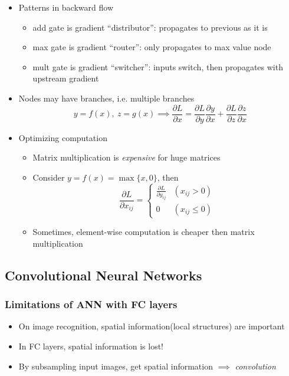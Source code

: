 \begin{itemize}
\begin{itemize}
    \end{itemize}
    \item Patterns in backward flow
    \begin{itemize}
        \item add gate is gradient ``distributor'': propagates to previous as it is
        \item max gate is gradient ``router'': only propagates to max value node
        \item mult gate is gradient ``switcher'': inputs switch, then propagates with upstream gradient
    \end{itemize}
    \item Nodes may have branches, i.e. multiple branches
    \begin{equation}
        y=f(x),~z=g(x)\implies\frac{\partial L}{\partial x}=\frac{\partial L}{\partial y}\frac{\partial y}{\partial x}+\frac{\partial L}{\partial z}\frac{\partial z}{\partial x}
    \end{equation}
    \item Optimizing computation
    \begin{itemize}
        \item Matrix multiplication is \textit{expensive} for huge matrices
        \item Consider $y=f(x)=\max\{x,0\}$, then
        \begin{equation}
            \frac{\partial L}{\partial x_{ij}}=\begin{cases}
                \frac{\partial L}{\partial y_{ij}} & (x_{ij}>0) \\
                0 & (x_{ij}\leq 0)
            \end{cases}
        \end{equation}
        \item Sometimes, element-wise computation is cheaper then matrix multiplication
    \end{itemize}
\end{itemize}

\subsection{Convolutional Neural Networks}

\subsubsection*{Limitations of ANN with FC layers}
\begin{itemize}
    \item On image recognition, spatial information(local structures) are important
    \item In FC layers, spatial information is lost!
    \item By subsampling input images, get spatial information $\implies$ \textit{convolution}
\end{itemize}
\begin{figures}
\end{figures}

